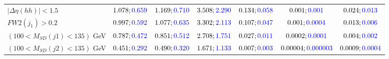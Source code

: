 \begin{landscape}
\begin{table}
\begin{tabular}{lcccccc}
				\rowcolor{black!7}$|\Delta\eta(hh)|<1.5$& $1.078;\textcolor{blue}{0.659}$&$1.169;\textcolor{blue}{0.710}$ &$3.508;\textcolor{blue}{2.290}$ &$0.134;\textcolor{blue}{0.058}$ &$0.001;\textcolor{blue}{0.001}$ &$0.024;\textcolor{blue}{0.013}$\\
				$FW2(j_1)>0.2$ &$0.997;\textcolor{blue}{0.592}$ &$1.077;\textcolor{blue}{0.635}$&$3.302;\textcolor{blue}{2.113}$&$0.107;\textcolor{blue}{0.047}$&$0.001;\textcolor{blue}{0.0004}$&$0.013;\textcolor{blue}{0.006}$\\
				\rowcolor{black!7}$(100<M_{SD}(j1)<135)$ GeV& $0.787;\textcolor{blue}{0.472}$&$0.851;\textcolor{blue}{0.512}$&$2.708;\textcolor{blue}{1.751}$&$0.027;\textcolor{blue}{0.011}$&$0.0002;\textcolor{blue}{0.0001}$&$0.004;\textcolor{blue}{0.002}$\\
				$(100<M_{SD}(j2)<135)$ GeV &$0.451;\textcolor{blue}{0.292}$ &$0.490;\textcolor{blue}{0.320}$ &$1.671;\textcolor{blue}{1.133}$&$0.007;\textcolor{blue}{0.003}$&$0.00004;\textcolor{blue}{0.000003}$&$0.0009;\textcolor{blue}{0.0004}$\\
				\bottomrule
			\end{tabular}
		\end{table}

\end{landscape}
	



